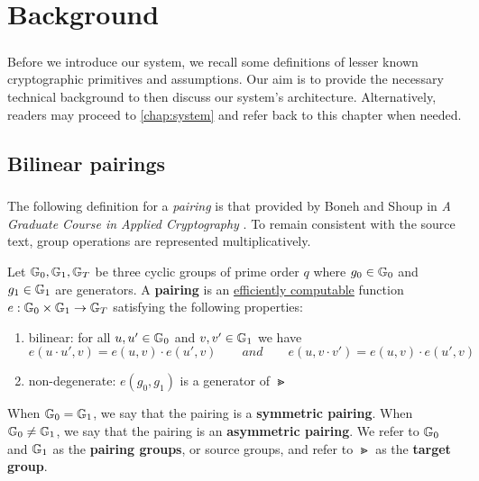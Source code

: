 \chapter{Background}
\label{chap:background}


\paragraph{} Before we introduce our system, we recall some definitions of lesser known cryptographic primitives and assumptions. Our aim is to provide the necessary technical background to then discuss our system's architecture. Alternatively, readers may proceed to \autoref{chap:system} and refer back to this chapter when needed.




\section{Bilinear pairings}

\paragraph{} The following definition for a \textit{pairing} is that provided by Boneh and Shoup in \textit{A Graduate Course in Applied Cryptography} \cite{BonehShoup}. To remain consistent with the source text, group operations are represented multiplicatively.

\begin{definition}
\label{def:pairing}
	Let $\mathbb{G}_0, \mathbb{G}_1, \mathbb{G}_T$ be three cyclic groups of prime order $q$ where $g_0 \in \mathbb{G}_0$ and $g_1 \in \mathbb{G}_1$ are generators. A \textbf{pairing} is an \underline{efficiently computable} function $e : \mathbb{G}_0 \times \mathbb{G}_1 \rightarrow \mathbb{G}_T$ satisfying the following properties:
	
		\begin{enumerate}
			\item bilinear: for all $u,u' \in \mathbb{G}_0$ and $v,v' \in \mathbb{G}_1$ we have
				\begin{equation}
					e(u \cdot u', v) = e(u,v) \cdot e(u',v) \qquad and \qquad e(u, v \cdot v') = e(u,v) \cdot e(u',v)
				\end{equation}
				
			\item non-degenerate: $e(g_0, g_1)$ is a generator of $\Gt$
		\end{enumerate}
		
	\noindent When $\mathbb{G}_0 = \mathbb{G}_1$, we say that the pairing is a \textbf{symmetric pairing}. When $\mathbb{G}_0 \neq \mathbb{G}_1$, we say that the pairing is an \textbf{asymmetric pairing}. We refer to $\mathbb{G}_0$ and $\mathbb{G}_1$ as the \textbf{pairing groups}, or source groups, and refer to $\Gt$ as the \textbf{target group}.
\end{definition}

